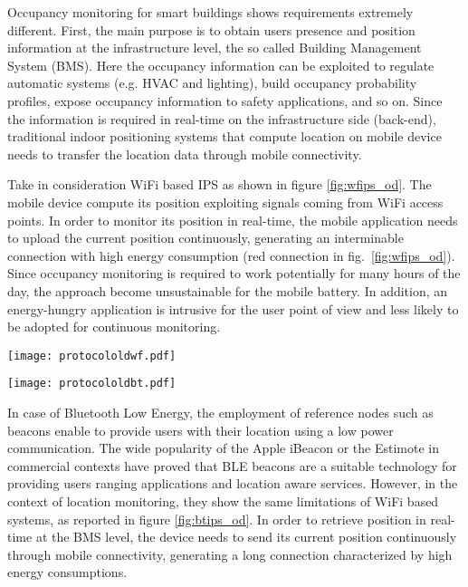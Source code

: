\smallskip
Occupancy monitoring for smart buildings shows requirements extremely different. First, the main purpose is to obtain users presence and position information at the infrastructure level, the so called Building Management System (BMS). Here the occupancy information can be exploited to regulate automatic systems (e.g. HVAC and lighting), build occupancy probability profiles, expose occupancy information to safety applications, and so on.
Since the information is required in real-time on the infrastructure side (back-end), traditional indoor positioning systems that compute location on mobile device needs to transfer the location data through mobile connectivity.

Take in consideration WiFi based IPS as shown in figure \ref{fig:wfips_od}. The mobile device compute its position exploiting signals coming from WiFi access points. In order to monitor its position in real-time, the mobile application needs to upload the current position continuously, generating an interminable connection with high energy consumption (red connection in fig.~\ref{fig:wfips_od}). Since occupancy monitoring is required to work potentially for many hours of the day, the approach become unsustainable for the mobile battery. In addition, an energy-hungry application is intrusive for the user point of view and less likely to be adopted for continuous monitoring.


\begin{figure*}
\center
\texttt{[image: protocololdwf.pdf]}
\caption{Common WiFi based IPS applied for real-time occupancy monitoring.}\label{fig:wfips_od}
\texttt{[image: protocololdbt.pdf]}
\caption{Common Bluetooth based IPS applied for real-time occupancy monitoring.}\label{fig:btips_od}
\end{figure*}

In case of Bluetooth Low Energy, the employment of reference nodes such as beacons enable to provide users with their location using a low power communication. The wide popularity of the Apple iBeacon or the Estimote in commercial contexts have proved that BLE beacons are a suitable technology for providing users ranging applications and location aware services. However, in the context of location monitoring, they show the same limitations of WiFi based systems, as reported in figure \ref{fig:btips_od}. In order to retrieve position in real-time at the BMS level, the device needs to send its current position continuously through mobile connectivity, generating a long connection characterized by high energy consumptions.

